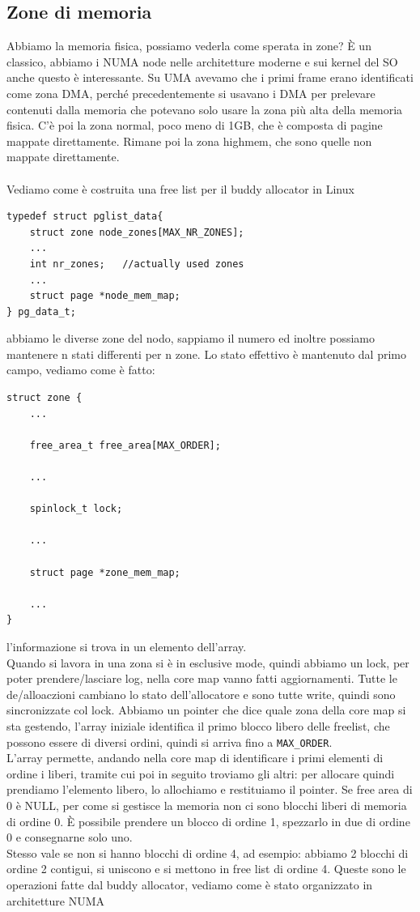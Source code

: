 \documentclass[12pt, oneside]{extbook}
\begin{document}
\subsection{Zone di memoria} 
Abbiamo la memoria fisica, possiamo vederla come sperata in zone? È un classico, abbiamo i NUMA node nelle architetture moderne e sui kernel del SO anche questo è interessante. Su UMA avevamo che i primi frame erano identificati come zona DMA, perché precedentemente si usavano i DMA per prelevare contenuti dalla memoria che potevano solo usare la zona più alta della memoria fisica. C'è poi la zona normal, poco meno di 1GB, che è composta di pagine mappate direttamente. Rimane poi la zona highmem, che sono quelle non mappate direttamente.\\\\ Vediamo come è costruita una free list per il buddy allocator in Linux
\begin{lstlisting}
typedef struct pglist_data{
	struct zone node_zones[MAX_NR_ZONES];
	...
	int nr_zones;	//actually used zones
	...
	struct page *node_mem_map;
} pg_data_t;
\end{lstlisting}
abbiamo le diverse zone del nodo, sappiamo il numero ed inoltre possiamo mantenere n stati differenti per n zone. Lo stato effettivo è mantenuto dal primo campo, vediamo come è fatto:
\begin{lstlisting}
struct zone {
	...
	
	free_area_t free_area[MAX_ORDER];
	
	...
	
	spinlock_t lock;
	
	...
	
	struct page *zone_mem_map;
	
	...
}
\end{lstlisting}
l'informazione si trova in un elemento dell'array.\\Quando si lavora in una zona si è in esclusive mode, quindi abbiamo un lock, per poter prendere/lasciare log, nella core map vanno fatti aggiornamenti. Tutte le de/alloaczioni cambiano lo stato dell'allocatore e sono tutte write, quindi sono sincronizzate col lock. Abbiamo un pointer che dice quale zona della core map si sta gestendo, l'array iniziale identifica il primo blocco libero delle freelist, che possono essere di diversi ordini, quindi si arriva fino a \texttt{MAX\_ORDER}.\\ L'array permette, andando nella core map di identificare i primi elementi di ordine i liberi, tramite cui poi in seguito troviamo gli altri: per allocare quindi prendiamo l'elemento libero, lo allochiamo e restituiamo il pointer. Se free area di 0 è NULL, per come si gestisce la memoria non ci sono blocchi liberi di memoria di ordine 0. È possibile prendere un blocco di ordine 1, spezzarlo in due di ordine 0 e consegnarne solo uno.\\ Stesso vale se non si hanno blocchi di ordine 4, ad esempio: abbiamo 2 blocchi di ordine 2 contigui, si uniscono e si mettono in free list di ordine 4. Queste sono le operazioni fatte dal buddy allocator, vediamo come è stato organizzato in architetture NUMA
\end{document}
